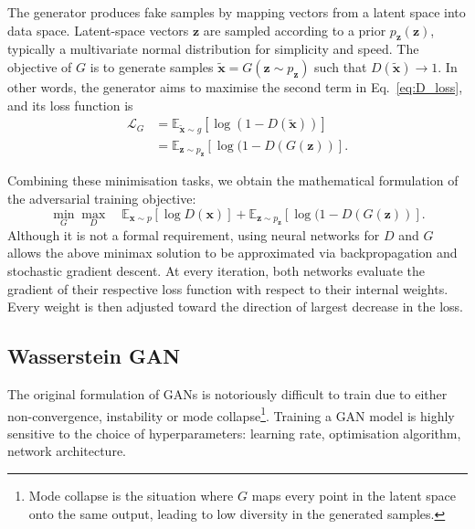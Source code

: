 The generator produces fake samples by mapping vectors from a latent space into data space. Latent-space vectors $\mathbf{z}$ are sampled according to a prior $p_\mathbf{z}(\mathbf{z})$, typically a multivariate normal distribution for simplicity and speed. The objective of $G$ is to generate samples $\tilde{\mathbf{x}} = G(\mathbf{z} \sim p_\mathbf{z})$ such that $D(\tilde{\mathbf{x}}) \rightarrow 1$. In other words, the generator aims to maximise the second term in Eq.~\ref{eq:D_loss}, and its loss function is
\begin{align*}
    \mathcal{L}_G &=     
    \mathbb{E}_{\tilde{\mathbf{x}} \sim g} [ \log( 1 - D(\tilde{\mathbf{x}}) )]\\
    &= \mathbb{E}_{\mathbf{z} \sim p_\mathbf{z}} [ \log( 1 - D(G(\mathbf{z}) )].
\end{align*}

Combining these minimisation tasks, we obtain the mathematical formulation of the adversarial training objective:
\begin{equation}\label{eq:GAN}
    \min_G \max_D \quad
    \mathbb{E}_{\mathbf{x} \sim p} [ \log D(\mathbf{x}) ] +
    \mathbb{E}_{\mathbf{z} \sim p_\mathbf{z}} [ \log( 1 - D(G(\mathbf{z}) )].
\end{equation}
Although it is not a formal requirement, using neural networks for $D$ and $G$ allows the above minimax solution to be approximated via backpropagation and stochastic gradient descent. At every iteration, both networks evaluate the gradient of their respective loss function with respect to their internal weights. Every weight is then adjusted toward the direction of largest decrease in the loss.


\subsection{Wasserstein GAN}
The original formulation of GANs is notoriously difficult to train due to either non-convergence, instability or mode collapse\footnote{Mode collapse is the situation where $G$ maps every point in the latent space onto the same output, leading to low diversity in the generated samples.}. 
Training a GAN model is highly sensitive to the choice of hyperparameters: learning rate, optimisation algorithm, network architecture. 

